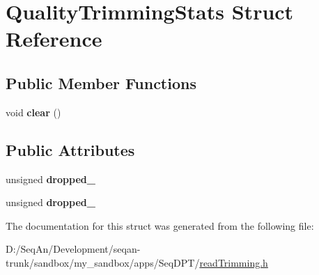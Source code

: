 \hypertarget{struct_quality_trimming_stats}{\section{Quality\-Trimming\-Stats Struct Reference}
\label{struct_quality_trimming_stats}
}
\subsection*{Public Member Functions}
\begin{DoxyCompactItemize}
\item 
\hypertarget{struct_quality_trimming_stats_afbf166ddb242c870cdb271c8bfa81bd4}{void {\bfseries clear} ()}\label{struct_quality_trimming_stats_afbf166ddb242c870cdb271c8bfa81bd4}

\end{DoxyCompactItemize}
\subsection*{Public Attributes}
\begin{DoxyCompactItemize}
\item 
\hypertarget{struct_quality_trimming_stats_a2a3f9b43f0112d825bb1043d64255428}{unsigned {\bfseries dropped\-\_}}\label{struct_quality_trimming_stats_a2a3f9b43f0112d825bb1043d64255428}

\item 
\hypertarget{struct_quality_trimming_stats_ab5c4b6046520e4279cd2000fef5983ef}{unsigned {\bfseries dropped\-\_}}\label{struct_quality_trimming_stats_ab5c4b6046520e4279cd2000fef5983ef}

\end{DoxyCompactItemize}


The documentation for this struct was generated from the following file\-:\begin{DoxyCompactItemize}
\item 
D\-:/\-Seq\-An/\-Development/seqan-\/trunk/sandbox/my\-\_\-sandbox/apps/\-Seq\-D\-P\-T/\hyperlink{read_trimming_8h}{read\-Trimming.\-h}\end{DoxyCompactItemize}
